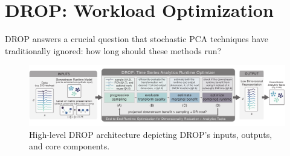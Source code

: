 \section{DROP: Workload Optimization}
\label{sec:algo}

DROP answers a crucial question that stochastic PCA techniques have traditionally ignored: how long should these methods run? 

\begin{figure}
\label{fig:arch}
\begin{center}
\includegraphics[width=\textwidth]{figs/system_arch.pdf}\vspace{-1em}
\caption[]{High-level DROP architecture depicting DROP's inputs, outputs, and core components.}
\end{center}
\vspace{-1em}
\end{figure}


